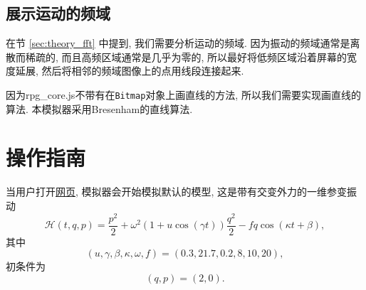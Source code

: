 \documentclass[12pt]{article}
\begin{document}
\subsection{展示运动的频域}

在节 \ref{sec:theory_fft} 中提到,
我们需要分析运动的频域.
因为振动的频域通常是离散而稀疏的,
而且高频区域通常是几乎为零的,
所以最好将低频区域沿着屏幕的宽度延展,
然后将相邻的频域图像上的点用线段连接起来.

因为rpg\_core.js不带有在\texttt{Bitmap}对象上画直线的方法,
所以我们需要实现画直线的算法.
本模拟器采用Bresenham的直线算法.

\section{操作指南}
\label{sec:program}

当用户打开\href{https://UlyssesZh.github.io/rpg/mechsimul2}{网页},
模拟器会开始模拟默认的模型,
这是带有交变外力\cite[p. 61]{landau1976mechanics}的一维参变振动\cite[p. 82]{landau1976mechanics}
\begin{equation}
  \mathcal H\left(t,q,p\right)=\frac{p^2}2+\omega^2\left(1+u\cos\left(\gamma t\right)\right)\frac{q^2}2-fq\cos\left(\kappa t+\beta\right),
\end{equation}
其中
\begin{equation*}
  \left(u,\gamma,\beta,\kappa,\omega,f\right)=\left(0.3,21.7,0.2,8,10,20\right),
\end{equation*}
初条件为
\begin{equation*}
  \left(q,p\right)=\left(2,0\right).
\end{equation*}
\end{document}
